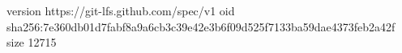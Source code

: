 version https://git-lfs.github.com/spec/v1
oid sha256:7e360db01d7fabf8a9a6cb3c39e42e3b6f09d525f7133ba59dae4373feb2a42f
size 12715
